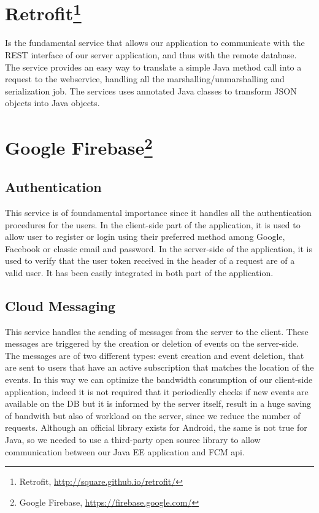 \documentclass[a4paper]{scrreprt}
\begin{document}
\section[Retrofit]{Retrofit\footnote{Retrofit, \url{http://square.github.io/retrofit/}}}
Is the fundamental service that allows our application to communicate with the REST interface of our server application, and thus with the remote database. The service provides an easy way to translate a simple Java method call into a request to the webservice, handling all the marshalling/unmarshalling and serialization job. The services uses annotated Java classes to transform JSON objects into Java objects.

\section[Google Firebase]{Google Firebase\footnote{Google Firebase, \url{https://firebase.google.com/}}}

\subsection{Authentication}
This service is of foundamental importance since it handles all the authentication procedures for the users. In the client-side part of the application, it is used to allow user to register or login using their preferred method among Google, Facebook or classic email and password. In the server-side of the application, it is used to verify that the user token received in the header of a request are of a valid user. It has been easily integrated in both part of the application.

\subsection{Cloud Messaging}
This service handles the sending of messages from the server to the client. These messages are triggered by the creation or deletion of events on the server-side. The messages are of two different types: event creation and event deletion, that are sent to users that have an active subscription that matches the location of the events. In this way we can optimize the bandwidth consumption of our client-side application, indeed it is not required that it periodically checks if new events are available on the DB but it is informed by the server itself, result in a huge saving of bandwith but also of workload on the server, since we reduce the number of requests. Although an official library exists for Android, the same is not true for Java, so we needed to use a third-party open source library to allow communication between our Java EE application and FCM api.
\end{document}
